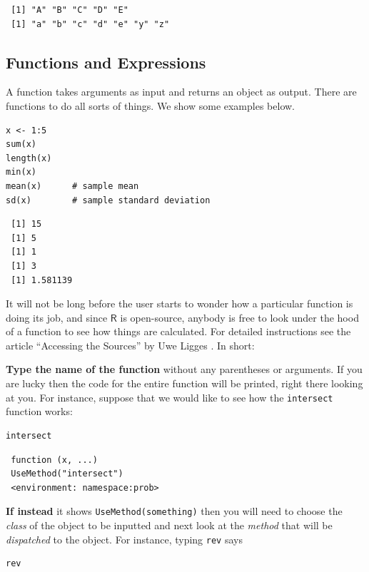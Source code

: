\documentclass[captions=tableheading]{scrbook}
\begin{document}
\begin{verbatim}
 [1] "A" "B" "C" "D" "E"
 [1] "a" "b" "c" "d" "e" "y" "z"
\end{verbatim}
\subsection{Functions and Expressions}
\label{sec-2-3-4}
\label{sub-Functions-and-Expressions}


A function takes arguments as input and returns an object as output. There are functions to do all sorts of things. We show some examples below.


\begin{verbatim}
x <- 1:5
sum(x)
length(x)
min(x)
mean(x)      # sample mean
sd(x)        # sample standard deviation
\end{verbatim}

\begin{verbatim}
 [1] 15
 [1] 5
 [1] 1
 [1] 3
 [1] 1.581139
\end{verbatim}

It will not be long before the user starts to wonder how a particular function is doing its job, and since \(\mathsf{R}\) is open-source, anybody is free to look under the hood of a function to see how things are calculated. For detailed instructions see the article ``Accessing the Sources'' by Uwe Ligges \cite{Ligges2006}. In short:

\textbf{Type the name of the function} without any parentheses or arguments. If you are lucky then the code for the entire function will be printed, right there looking at you. For instance, suppose that we would like to see how the \texttt{intersect} function works:


\begin{verbatim}
intersect
\end{verbatim}

\begin{verbatim}
 function (x, ...) 
 UseMethod("intersect")
 <environment: namespace:prob>
\end{verbatim}

\textbf{If instead} it shows \texttt{UseMethod(something)} then you will need to choose the \emph{class} of the object to be inputted and next look at the \emph{method} that will be \emph{dispatched} to the object. For instance, typing \texttt{rev} says 


\begin{verbatim}
rev
\end{verbatim}
\end{document}

